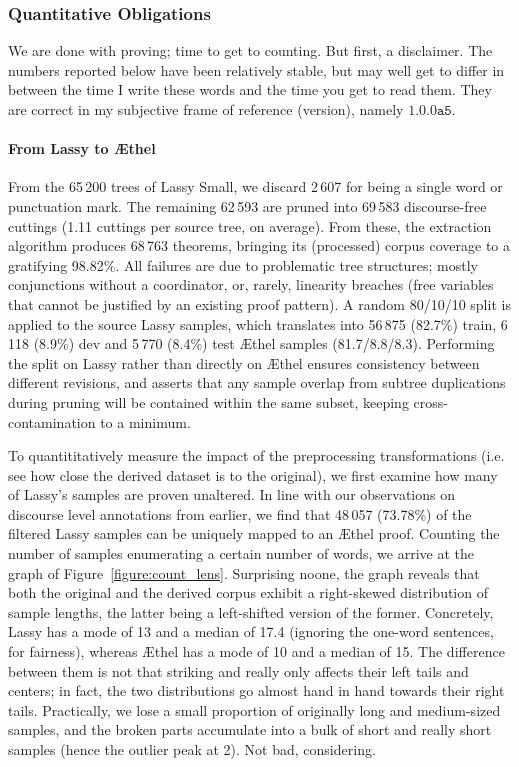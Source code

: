 \subsubsection{Quantitative Obligations}
We are done with proving; time to get to counting.
But first, a disclaimer.
The numbers reported below have been relatively stable, but may well get to differ in between the time I write these words and the time you get to read them.
They are correct in my subjective frame of reference (version), namely $\mathtt{1.0.0a5}$. 

\paragraph{From Lassy to \AE thel}
From the 65\,200 trees of Lassy Small, we discard 2\,607 for being a single word or punctuation mark.
The remaining 62\,593 are pruned into 69\,583 discourse-free cuttings (1.11 cuttings per source tree, on average).
From these, the extraction algorithm produces 68\,763 theorems, bringing its (processed) corpus coverage to a gratifying 98.82\%.
All failures are due to problematic tree structures; mostly conjunctions without a coordinator, or, rarely, linearity breaches (free variables that cannot be justified by an existing proof pattern).
A random 80/10/10 split is applied to the source Lassy samples, which translates into 56\,875 (82.7\%) train, 6\,118 (8.9\%) dev and 5\,770 (8.4\%) test \AE thel samples (81.7/8.8/8.3).
Performing the split on Lassy rather than directly on \AE thel ensures consistency between different revisions, and asserts that any sample overlap from subtree duplications during pruning will be contained within the same subset, keeping cross-contamination to a minimum.

To quantititatively measure the impact of the preprocessing transformations (i.e. see how close the derived dataset is to the original), we first examine how many of Lassy's samples are proven unaltered.
In line with our observations on discourse level annotations from earlier, we find that 48\,057 (73.78\%) of the filtered Lassy samples can be uniquely mapped to an \AE thel proof.
Counting the number of samples enumerating a certain number of words, we arrive at the graph of Figure~\ref{figure:count_lens}.
Surprising noone, the graph reveals that both the original and the derived corpus exhibit a right-skewed distribution of sample lengths, the latter being a left-shifted version of the former.
Concretely, Lassy has a mode of 13 and a median of 17.4 (ignoring the one-word sentences, for fairness), whereas \AE thel has a mode of 10 and a median of 15.
The difference between them is not that striking and really only affects their left tails and centers; in fact, the two distributions go almost hand in hand towards their right tails.
Practically, we lose a small proportion of originally long and medium-sized samples, and the broken parts accumulate into a bulk of short and really short samples (hence the outlier peak at 2).
Not bad, considering.

